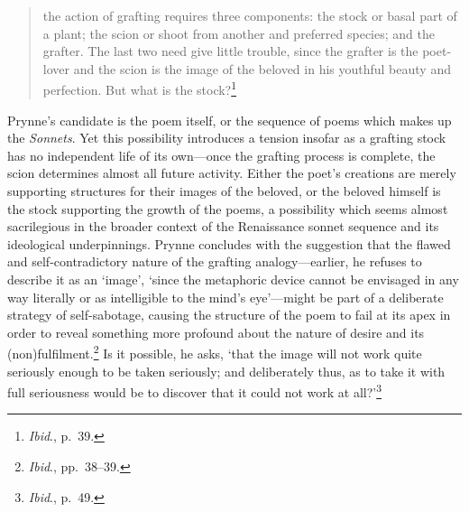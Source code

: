 \documentclass[]{article}
\begin{document}
\begin{quote}
the action of grafting requires three components: the stock or basal
part of a plant; the scion or shoot from another and preferred species;
and the grafter. The last two need give little trouble, since the
grafter is the poet-lover and the scion is the image of the beloved in
his youthful beauty and perfection. But what is the stock?\footnote{\emph{Ibid}.,
  p.~39.}
\end{quote}

Prynne's candidate is the poem itself, or the sequence of poems which
makes up the \emph{Sonnets}. Yet this possibility introduces a tension
insofar as a grafting stock has no independent life of its own---once
the grafting process is complete, the scion determines almost all future
activity. Either the poet's creations are merely supporting structures
for their images of the beloved, or the beloved himself is the stock
supporting the growth of the poems, a possibility which seems almost
sacrilegious in the broader context of the Renaissance sonnet sequence
and its ideological underpinnings. Prynne concludes with the suggestion
that the flawed and self-contradictory nature of the grafting
analogy---earlier, he refuses to describe it as an `image', `since the
metaphoric device cannot be envisaged in any way literally or as
intelligible to the mind's eye'---might be part of a deliberate strategy
of self-sabotage, causing the structure of the poem to fail at its apex
in order to reveal something more profound about the nature of desire
and its (non)fulfilment.\footnote{\emph{Ibid}., pp.~38--39.} Is it
possible, he asks, `that the image will not work quite seriously enough
to be taken seriously; and deliberately thus, as to take it with full
seriousness would be to discover that it could not work at
all?'\footnote{\emph{Ibid}., p.~49.}
\end{document}
